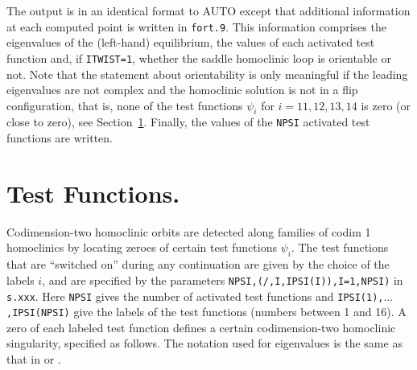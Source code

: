 \documentclass[12pt]{report}
\begin{document}
The output is in an identical format to {\cal AUTO} except that
additional information at each computed point is written 
in {\tt fort.9}. This information comprises the eigenvalues of
the (left-hand) equilibrium, the values of each activated test
function and, if {\tt ITWIST=1}, 
whether the saddle homoclinic loop is orientable
or not.
Note that the statement about orientability is only meaningful if the
leading eigenvalues are not complex and the homoclinic solution is not
in a flip configuration, that is, none of the test functions 
$\psi_i$ for $i=11,12,13,14$ is zero (or close to zero), 
see Section~\ref{sec:HomCont_Test_functions}.
 Finally, the values of the {\tt NPSI} activated test functions are written. 

\section{ Test Functions.} \label{sec:HomCont_Test_functions}
Codimension-two homoclinic orbits are detected along families of codim
1 homoclinics by locating zeroes of certain test functions
$\psi_i$. The test functions that are ``switched on'' during any
continuation are given by the choice of the labels $i$, and are
specified by the parameters {\tt NPSI,(/,I,IPSI(I)),I=1,NPSI)} in {\tt
s.xxx}.  Here {\tt NPSI} gives the number of activated test functions
and {\tt IPSI(1),$\ldots$,IPSI(NPSI)} give the labels of
the test functions (numbers between 1 and 16). A zero of
each labeled test function defines a certain codimension-two 
homoclinic singularity, specified as follows.
The notation used for eigenvalues is the same as that in
 or . 
\end{document}
